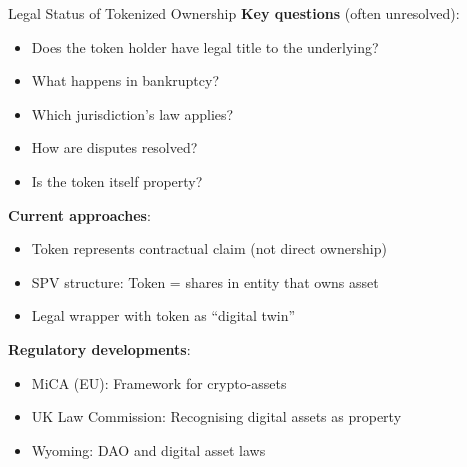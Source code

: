 \documentclass[10pt]{beamer}
\begin{document}
\begin{frame}{Legal Status of Tokenized Ownership}
  \textbf{Key questions} (often unresolved):
  \begin{itemize}
    \item Does the token holder have legal title to the underlying?
    \item What happens in bankruptcy?
    \item Which jurisdiction's law applies?
    \item How are disputes resolved?
    \item Is the token itself property?
  \end{itemize}
  
  \vspace{0.5em}
  \textbf{Current approaches}:
  \begin{itemize}
    \item Token represents contractual claim (not direct ownership)
    \item SPV structure: Token = shares in entity that owns asset
    \item Legal wrapper with token as ``digital twin''
  \end{itemize}
  
  \vspace{0.5em}
  \textbf{Regulatory developments}:
  \begin{itemize}
    \item MiCA (EU): Framework for crypto-assets
    \item UK Law Commission: Recognising digital assets as property
    \item Wyoming: DAO and digital asset laws
  \end{itemize}
\end{frame}
\end{document}
